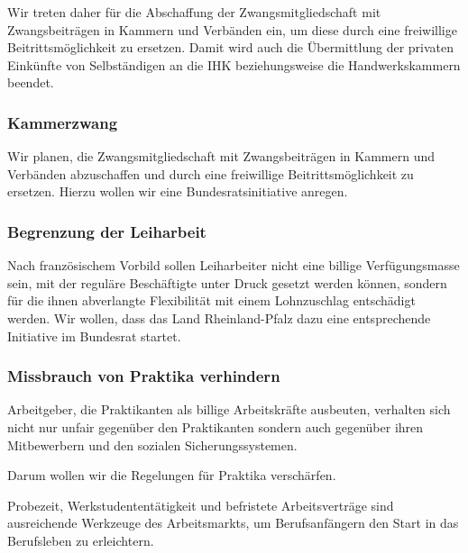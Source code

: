 Wir treten daher für die Abschaffung der Zwangsmitgliedschaft mit Zwangsbeiträgen in Kammern und Verbänden ein, um diese durch eine freiwillige Beitrittsmöglichkeit zu ersetzen. Damit wird auch die Übermittlung der privaten Einkünfte von Selbständigen an die IHK beziehungsweise die Handwerkskammern beendet.
 
\label{wp:wirt:zwang2}

\subsubsection{Kammerzwang}
\abstimmung
Wir planen, die Zwangsmitgliedschaft mit Zwangsbeiträgen in Kammern und Verbänden abzuschaffen und durch eine freiwillige Beitrittsmöglichkeit zu ersetzen. Hierzu wollen wir eine Bundesratsinitiative anregen.
 

\subsubsection{Begrenzung der Leiharbeit}
\abstimmung
Nach französischem Vorbild sollen Leiharbeiter nicht eine billige Verfügungsmasse sein, mit der reguläre Beschäftigte unter Druck gesetzt werden können, sondern für die ihnen abverlangte Flexibilität mit einem Lohnzuschlag entschädigt werden. Wir wollen, dass das Land Rheinland-Pfalz dazu eine entsprechende Initiative im Bundesrat startet.
 

\subsubsection{Missbrauch von Praktika verhindern}
\abstimmung
Arbeitgeber, die Praktikanten als billige Arbeitskräfte ausbeuten, verhalten sich nicht nur unfair gegenüber den Praktikanten sondern auch gegenüber ihren Mitbewerbern und den sozialen Sicherungssystemen.

Darum wollen wir die Regelungen für Praktika verschärfen.

Probezeit, Werkstudententätigkeit und befristete Arbeitsverträge sind ausreichende Werkzeuge des Arbeitsmarkts, um Berufsanfängern den Start in das Berufsleben zu erleichtern.

